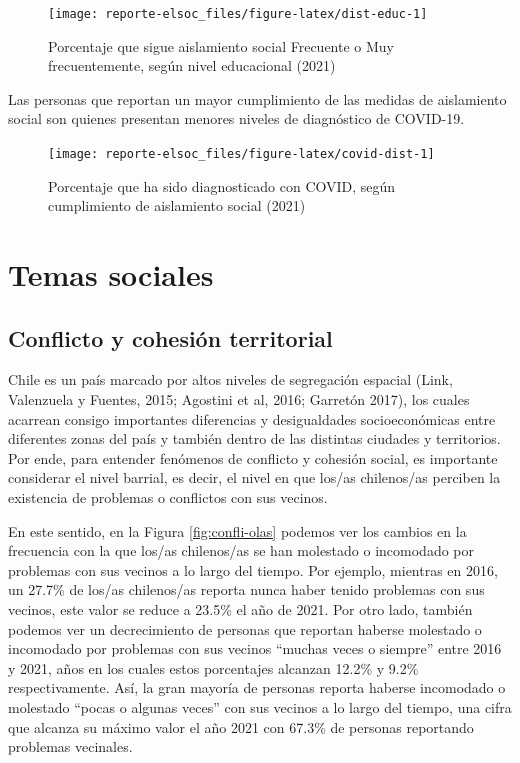 \documentclass[
  12pt,
]{book}
\begin{document}
\begin{figure}

{\centering \texttt{[image: reporte-elsoc\_files/figure-latex/dist-educ-1]} 

}

\caption{Porcentaje que sigue aislamiento social Frecuente o Muy frecuentemente, según nivel educacional (2021)}\label{fig:dist-educ}
\end{figure}

Las personas que reportan un mayor cumplimiento de las medidas de aislamiento social son quienes presentan menores niveles de diagnóstico de COVID-19.

\begin{figure}

{\centering \texttt{[image: reporte-elsoc\_files/figure-latex/covid-dist-1]} 

}

\caption{Porcentaje que ha sido diagnosticado con COVID, según cumplimiento de aislamiento social (2021)}\label{fig:covid-dist}
\end{figure}

\hypertarget{temas-sociales}{%
\chapter{Temas sociales}\label{temas-sociales}}

\hypertarget{conflicto-y-cohesiuxf3n-territorial}{%
\section{Conflicto y cohesión territorial}\label{conflicto-y-cohesiuxf3n-territorial}}

Chile es un país marcado por altos niveles de segregación espacial (Link, Valenzuela y Fuentes, 2015; Agostini et al, 2016; Garretón 2017), los cuales acarrean consigo importantes diferencias y desigualdades socioeconómicas entre diferentes zonas del país y también dentro de las distintas ciudades y territorios. Por ende, para entender fenómenos de conflicto y cohesión social, es importante considerar el nivel barrial, es decir, el nivel en que los/as chilenos/as perciben la existencia de problemas o conflictos con sus vecinos.

En este sentido, en la Figura \ref{fig:confli-olas} podemos ver los cambios en la frecuencia con la que los/as chilenos/as se han molestado o incomodado por problemas con sus vecinos a lo largo del tiempo. Por ejemplo, mientras en 2016, un 27.7\% de los/as chilenos/as reporta nunca haber tenido problemas con sus vecinos, este valor se reduce a 23.5\% el año de 2021. Por otro lado, también podemos ver un decrecimiento de personas que reportan haberse molestado o incomodado por problemas con sus vecinos ``muchas veces o siempre'' entre 2016 y 2021, años en los cuales estos porcentajes alcanzan 12.2\% y 9.2\% respectivamente. Así, la gran mayoría de personas reporta haberse incomodado o molestado ``pocas o algunas veces'' con sus vecinos a lo largo del tiempo, una cifra que alcanza su máximo valor el año 2021 con 67.3\% de personas reportando problemas vecinales.
\end{document}

